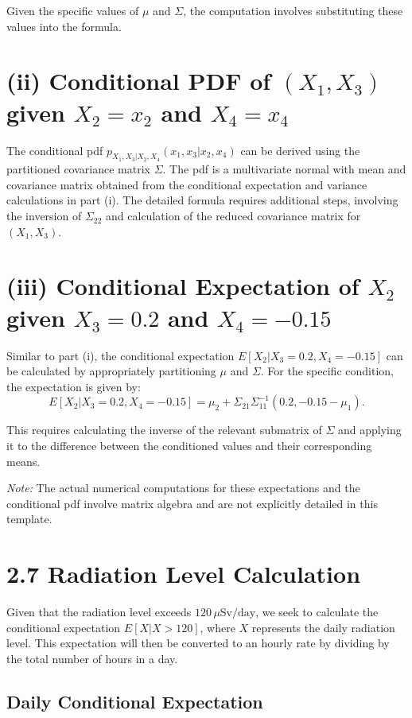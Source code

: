 \documentclass{article}
\begin{document}
Given the specific values of \(\mu\) and \(\Sigma\), the computation involves substituting these values into the formula.

\section*{(ii) Conditional PDF of \((X_1, X_3)\) given \(X_2 = x_2\) and \(X_4 = x_4\)}

The conditional pdf \(p_{X_1,X_3|X_2,X_4}(x_1, x_3 | x_2, x_4)\) can be derived using the partitioned covariance matrix \(\Sigma\). The pdf is a multivariate normal with mean and covariance matrix obtained from the conditional expectation and variance calculations in part (i). The detailed formula requires additional steps, involving the inversion of \(\Sigma_{22}\) and calculation of the reduced covariance matrix for \((X_1, X_3)\).

\section*{(iii) Conditional Expectation of \(X_2\) given \(X_3 = 0.2\) and \(X_4 = -0.15\)}

Similar to part (i), the conditional expectation \(E[X_2 | X_3 = 0.2, X_4 = -0.15]\) can be calculated by appropriately partitioning \(\mu\) and \(\Sigma\). For the specific condition, the expectation is given by:
\[ E[X_2 | X_3 = 0.2, X_4 = -0.15] = \mu_2 + \Sigma_{21} \Sigma_{11}^{-1} (0.2, -0.15 - \mu_1). \]

This requires calculating the inverse of the relevant submatrix of \(\Sigma\) and applying it to the difference between the conditioned values and their corresponding means.

\textit{Note:} The actual numerical computations for these expectations and the conditional pdf involve matrix algebra and are not explicitly detailed in this template.

\section*{2.7 Radiation Level Calculation}

Given that the radiation level exceeds $120\, \mu\text{Sv}/\text{day}$, we seek to calculate the conditional expectation $E[X | X > 120]$, where $X$ represents the daily radiation level. This expectation will then be converted to an hourly rate by dividing by the total number of hours in a day.

\subsection*{Daily Conditional Expectation}
\end{document}
